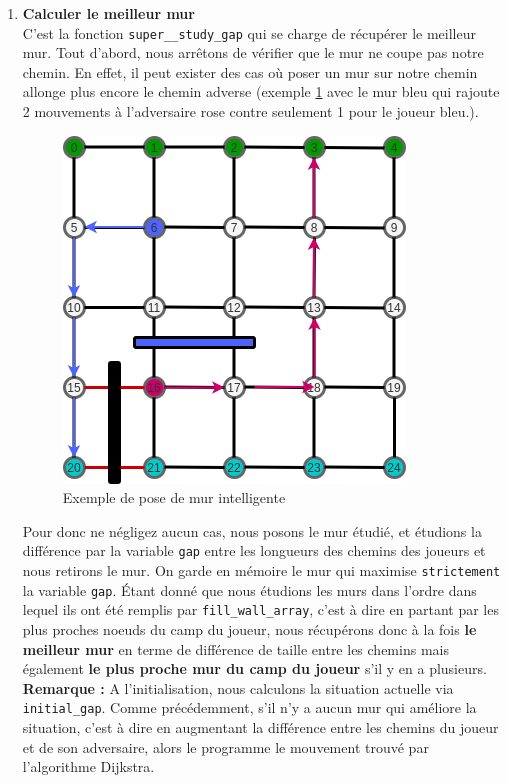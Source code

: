 \documentclass[a4paper]{article}
\begin{document}
\begin{enumerate}
    \item \textbf{Calculer le meilleur mur} \\
C'est la fonction \texttt{super\_\_study\_gap} qui se charge de récupérer le meilleur mur. Tout d'abord, nous arrêtons de vérifier que le mur ne coupe pas notre chemin. En effet, il peut exister des cas où poser un mur sur notre chemin allonge plus encore le chemin adverse (exemple \ref{fig:study_gap1} avec le mur bleu qui rajoute 2 mouvements à l'adversaire rose contre seulement 1 pour le joueur bleu.). \\
    
\begin{figure}[ht!]
    \centering
    \includegraphics[scale=0.6]{study_gap1.png}
    \caption{Exemple de pose de mur intelligente}
    \label{fig:study_gap1}
\end{figure}

Pour donc ne négligez aucun cas, nous posons le mur étudié, et étudions la différence par la variable \texttt{gap} entre les longueurs des chemins des joueurs et nous retirons le mur. On garde en mémoire le mur qui maximise \texttt{strictement} la variable \texttt{gap}. Étant donné que nous étudions les murs dans l'ordre dans lequel ils ont été remplis par \texttt{fill\_wall\_array}, c'est à dire en partant par les plus proches noeuds du camp du joueur, nous récupérons donc à la fois \textbf{le meilleur mur} en terme de différence de taille entre les chemins mais également \textbf{le plus proche mur du camp du joueur} s'il y en a plusieurs. \\

\textbf{Remarque :} A l'initialisation, nous calculons la situation actuelle via \texttt{initial\_gap}. Comme précédemment, s'il n'y a aucun mur qui améliore la situation, c'est à dire en augmentant la différence entre les chemins du joueur et de son adversaire, alors le programme le mouvement trouvé par l'algorithme Dijkstra.
    
\end{enumerate}
 
\end{document}
